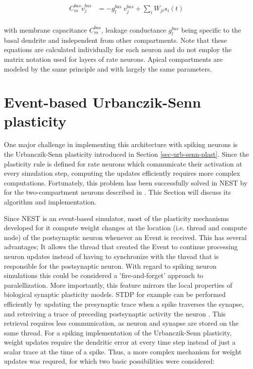 \begin{align}
  C_m^{bas} \dot{v}_j^{bas} & = -g_l^{bas} \  v_j^{bas} + \sum_i W_{ji} s_i(t)     \label{eq-spiking-basal-compartment} \\
\end{align}

with membrane capacitance $C_m^{bas}$, leakage conductance $g_l^{bas}$ being specific to the basal dendrite and
independent from other compartments. Note that these equations are calculated individually for each neuron and do not
employ the matrix notation used for layers of rate neurons. Apical compartments are modeled by the same principle and
with largely the same parameters.

\section{Event-based Urbanczik-Senn plasticity}\label{sec-event-urb}

One major challenge in implementing this architecture with spiking neurons is the Urbanczik-Senn plasticity introduced
in Section \ref{sec-urb-senn-plast}. Since the plasticity rule is defined for rate neurons which communicate their
activation at every simulation step, computing the updates efficiently requires more complex computations. Fortunately,
this problem has been successfully solved in NEST by \cite{Stapmanns2021} for the two-compartment neurons described in
\cite{urbanczik2014learning}. This Section will discuss its algorithm and implementation. \newline

Since NEST is an event-based simulator, most of the plasticity mechanisms developed for it compute weight changes at the
location (i.e. thread and compute node) of the postsynaptic neuron whenever an Event is received. This has several
advantages; It allows the thread that created the Event to continue processing neuron updates instead of having to
synchronize with the thread that is responsible for the postsynaptic neuron. With regard to spiking neuron simulations
this could be considered a 'fire-and-forget' approach to paralellization. More importantly, this feature mirrors the
local properties of biological synaptic plasticity models. STDP for example can be performed efficiently by updating the
presynaptic trace when a spike traverses the synapse, and retreiving a trace of preceding postsynaptic activity the
neuron \citep{Morrison2008}. This retrieval requires less communication, as neuron and synapse are stored on the same
thread. For a spiking implementation of the Urbanczik-Senn plasticity, weight updates require the dendritic error at
every time step instead of just a scalar trace at the time of a spike. Thus, a more complex mechanism for weight updates
was requred, for which two basic possibilities were considered:


